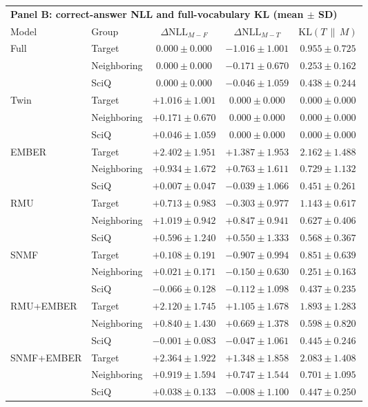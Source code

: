 \begin{table}[t]
  \vspace{1em}
  \begin{tabular}{llccc}
    \toprule
    \multicolumn{5}{l}{\textbf{Panel B: correct-answer NLL and full-vocabulary KL (mean $\pm$ SD)}} \\
    \cmidrule(lr){1-5}
    Model & Group & $\Delta\mathrm{NLL}_{M-F}$ & $\Delta\mathrm{NLL}_{M-T}$ & $\mathrm{KL}(T\,\|\,M)$ \\
    \midrule
    Full  & Target      & $0.000 \pm 0.000$ & $-1.016 \pm 1.001$ & $0.955 \pm 0.725$ \\
          & Neighboring & $0.000 \pm 0.000$ & $-0.171 \pm 0.670$ & $0.253 \pm 0.162$ \\
          & SciQ        & $0.000 \pm 0.000$ & $-0.046 \pm 1.059$ & $0.438 \pm 0.244$ \\
    Twin  & Target      & $+1.016 \pm 1.001$ & $0.000 \pm 0.000$ & $0.000 \pm 0.000$ \\
          & Neighboring & $+0.171 \pm 0.670$ & $0.000 \pm 0.000$ & $0.000 \pm 0.000$ \\
          & SciQ        & $+0.046 \pm 1.059$ & $0.000 \pm 0.000$ & $0.000 \pm 0.000$ \\
    EMBER & Target      & $\mathbf{+2.402 \pm 1.951}$ & $+1.387 \pm 1.953$ & $2.162 \pm 1.488$ \\
          & Neighboring & $+0.934 \pm 1.672$ & $+0.763 \pm 1.611$ & $0.729 \pm 1.132$ \\
          & SciQ        & $+0.007 \pm 0.047$ & $-0.039 \pm 1.066$ & $0.451 \pm 0.261$ \\
    RMU   & Target      & $+0.713 \pm 0.983$ & $\mathbf{-0.303 \pm 0.977}$ & $1.143 \pm 0.617$ \\
          & Neighboring & $+1.019 \pm 0.942$ & $+0.847 \pm 0.941$ & $0.627 \pm 0.406$ \\
          & SciQ        & $+0.596 \pm 1.240$ & $+0.550 \pm 1.333$ & $0.568 \pm 0.367$ \\
    SNMF  & Target      & $+0.108 \pm 0.191$ & $-0.907 \pm 0.994$ & $\mathbf{0.851 \pm 0.639}$ \\
          & Neighboring & $\mathbf{+0.021 \pm 0.171}$ & $\mathbf{-0.150 \pm 0.630}$ & $\mathbf{0.251 \pm 0.163}$ \\
          & SciQ        & $-0.066 \pm 0.128$ & $-0.112 \pm 1.098$ & $\mathbf{0.437 \pm 0.235}$ \\
    RMU+EMBER & Target      & $+2.120 \pm 1.745$ & $+1.105 \pm 1.678$ & $1.893 \pm 1.283$ \\
          & Neighboring & $+0.840 \pm 1.430$ & $+0.669 \pm 1.378$ & $0.598 \pm 0.820$ \\
          & SciQ        & $\mathbf{-0.001 \pm 0.083}$ & $-0.047 \pm 1.061$ & $0.445 \pm 0.246$ \\
    SNMF+EMBER & Target      & $+2.364 \pm 1.922$ & $+1.348 \pm 1.858$ & $2.083 \pm 1.408$ \\
          & Neighboring & $+0.919 \pm 1.594$ & $+0.747 \pm 1.544$ & $0.701 \pm 1.095$ \\
          & SciQ        & $+0.038 \pm 0.133$ & $\mathbf{-0.008 \pm 1.100}$ & $0.447 \pm 0.250$ \\
    \bottomrule
  \end{tabular}


\end{table}
